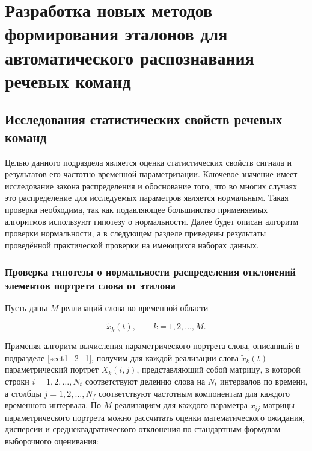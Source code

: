 \chapter{Разработка новых методов формирования эталонов для автоматического распознавания речевых команд} \label{chapt2}

\section{Исследования статистических свойств речевых команд} \label{sect2_1}

Целью данного подраздела является оценка статистических свойств сигнала и результатов его частотно-временной параметризации.
Ключевое значение имеет исследование закона распределения и обоснование того, что во многих случаях это распределение для исследуемых параметров является нормальным.
Такая проверка необходима, так как подавляющее большинство применяемых алгоритмов используют гипотезу о нормальности.
Далее будет описан алгоритм проверки нормальности, а в следующем разделе приведены результаты проведённой практической проверки на имеющихся наборах данных.


\subsection{Проверка гипотезы о нормальности распределения отклонений элементов портрета слова от эталона} \label{sect2_1_1}

Пусть даны $M$ реализаций слова во временной области

\begin{equation} \label{eq:2_1_1_1}
\tilde{x}_k (t), \qquad k = 1, 2, \dots, M.
\end{equation}

Применяя алгоритм вычисления параметрического портрета слова, описанный в подразделе \ref{sect1_2_1}, получим для каждой реализации слова $\tilde{x}_k (t)$ параметрический портрет $X_k (i, j)$, представляющий собой матрицу, в которой строки $i = 1, 2, \dots, N_t$ соответствуют делению слова на $N_t$ интервалов по времени, а столбцы $j = 1, 2, \dots, N_f$ соответствуют частотным компонентам для каждого временного интервала.
По $M$ реализациям для каждого параметра $x_{ij}$ матрицы параметрического портрета можно рассчитать оценки математического ожидания, дисперсии и среднеквадратического отклонения по стандартным формулам выборочного оценивания:

